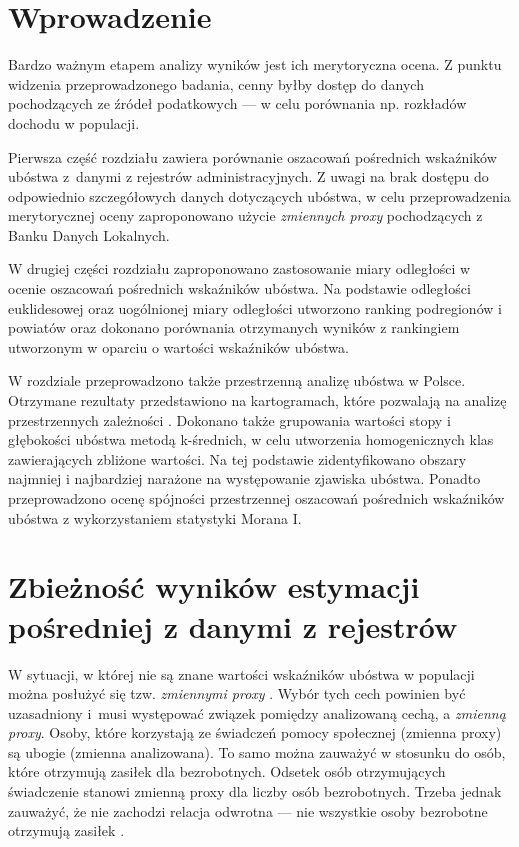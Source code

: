 \section{Wprowadzenie}

Bardzo ważnym etapem analizy wyników jest ich merytoryczna ocena. Z punktu widzenia przeprowadzonego badania, cenny byłby dostęp do danych pochodzących ze źródeł podatkowych --- w celu porównania np. rozkładów dochodu w populacji. 

Pierwsza część rozdziału zawiera porównanie oszacowań pośrednich wskaźników ubóstwa z~danymi z rejestrów administracyjnych. Z uwagi na brak dostępu do odpowiednio szczegółowych danych dotyczących ubóstwa, w celu przeprowadzenia merytorycznej oceny zaproponowano użycie \textit{zmiennych proxy} pochodzących z Banku Danych Lokalnych.

W drugiej części rozdziału zaproponowano zastosowanie miary odległości w ocenie oszacowań pośrednich wskaźników ubóstwa. Na podstawie odległości euklidesowej oraz uogólnionej miary odległości \citep{walesiak2011} utworzono ranking podregionów i powiatów oraz dokonano porównania otrzymanych wyników z rankingiem utworzonym w oparciu o wartości wskaźników ubóstwa. 

W rozdziale przeprowadzono także przestrzenną analizę ubóstwa w Polsce. Otrzymane rezultaty przedstawiono na kartogramach, które pozwalają na analizę przestrzennych zależności \citep{simler2007}. Dokonano także grupowania wartości stopy i głębokości ubóstwa metodą k-średnich, w celu utworzenia homogenicznych klas zawierających zbliżone wartości. Na tej podstawie zidentyfikowano obszary najmniej i najbardziej narażone na występowanie zjawiska ubóstwa. Ponadto przeprowadzono ocenę spójności przestrzennej oszacowań pośrednich wskaźników ubóstwa z wykorzystaniem statystyki Morana I. 

\section{Zbieżność wyników estymacji pośredniej z danymi z rejestrów}

W sytuacji, w której nie są znane wartości wskaźników ubóstwa w populacji można posłużyć się tzw. \textit{zmiennymi proxy} \citep{analpovdata42016}. Wybór tych cech powinien być uzasadniony i~musi występować związek pomiędzy analizowaną cechą, a \textit{zmienną proxy}. Osoby, które korzystają ze świadczeń pomocy społecznej (zmienna proxy) są ubogie (zmienna analizowana). To samo można zauważyć w stosunku do osób, które otrzymują zasiłek dla bezrobotnych. Odsetek osób otrzymujących świadczenie stanowi zmienną proxy dla liczby osób bezrobotnych. Trzeba jednak zauważyć, że nie zachodzi relacja odwrotna --- nie wszystkie osoby bezrobotne otrzymują zasiłek \citep{fenton2013}. 

